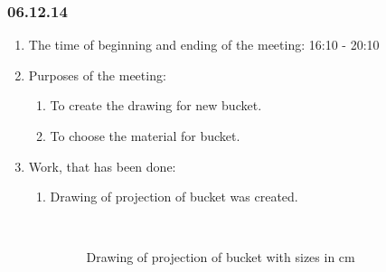 \subsubsection{06.12.14}

\begin{enumerate}
	\item The time of beginning and ending of the meeting:
	16:10 - 20:10
	\item Purposes of the meeting:
	\begin{enumerate}
	  \item To create the drawing for new bucket.
	  
	  \item To choose the material for bucket.
	  
    \end{enumerate}
	\item Work, that has been done:
	\begin{enumerate}
	  \item Drawing of projection of bucket was created.
	  
	  \begin{figure}[H]
	  	\begin{minipage}[h]{0.2\linewidth}
	  		\center  
	  	\end{minipage}
	  	\begin{minipage}[h]{0.6\linewidth}
	  		\caption{Drawing of projection of bucket with sizes in cm}
	  	\end{minipage}
	  \end{figure}
	  

\end{enumerate}
\end{enumerate}
